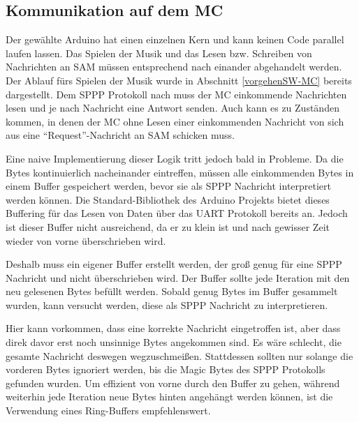 \subsection{Kommunikation auf dem \ac{MC}} \label{umsetzungSW-Kommunikation-MC}

Der gewählte Arduino hat einen einzelnen Kern und kann keinen Code parallel laufen lassen.
Das Spielen der Musik und das Lesen bzw. Schreiben von Nachrichten an \ac{SAM} müssen entsprechend nach einander abgehandelt werden.
Der Ablauf fürs Spielen der Musik wurde in Abschnitt \ref{vorgehenSW-MC} bereits dargestellt.
Dem \ac{SPPP} Protokoll nach muss der \ac{MC} einkommende Nachrichten lesen und je nach Nachricht eine Antwort senden.
Auch kann es zu Zuständen kommen, in denen der \ac{MC} ohne Lesen einer einkommenden Nachricht von sich aus eine \enquote{Request}-Nachricht an \ac{SAM} schicken muss.

Eine naive Implementierung dieser Logik tritt jedoch bald in Probleme.
Da die Bytes kontinuierlich nacheinander eintreffen, müssen alle einkommenden Bytes in einem Buffer gespeichert werden, bevor sie als \ac{SPPP} Nachricht interpretiert werden können.
Die Standard-Bibliothek des Arduino Projekts bietet dieses Buffering für das Lesen von Daten über das \ac{UART} Protokoll bereits an.
Jedoch ist dieser Buffer nicht ausreichend, da er zu klein ist und nach gewisser Zeit wieder von vorne überschrieben wird.

Deshalb muss ein eigener Buffer erstellt werden, der groß genug für eine \ac{SPPP} Nachricht und nicht überschrieben wird.
Der Buffer sollte jede Iteration mit den neu gelesenen Bytes befüllt werden.
Sobald genug Bytes im Buffer gesammelt wurden, kann versucht werden, diese als \ac{SPPP} Nachricht zu interpretieren.

Hier kann vorkommen, dass eine korrekte Nachricht eingetroffen ist, aber dass direk davor erst noch unsinnige Bytes angekommen sind.
Es wäre schlecht, die gesamte Nachricht deswegen wegzuschmeißen.
Stattdessen sollten nur solange die vorderen Bytes ignoriert werden, bis die Magic Bytes des \ac{SPPP} Protokolls gefunden wurden.
Um effizient von vorne durch den Buffer zu gehen, während weiterhin jede Iteration neue Bytes hinten angehängt werden können, ist die Verwendung eines Ring-Buffers empfehlenswert.

